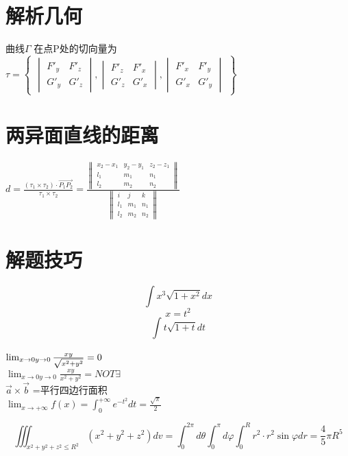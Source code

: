 \documentclass[UTF8]{ctexart}
\begin{document}
\section{解析几何}
曲线$\Gamma $ 在点P处的切向量为
$ \tau =
\begin{Bmatrix}

\begin{vmatrix}
F'_y & F'_z \\
G'_y & G'_z
\end{vmatrix}
,
\begin{vmatrix}
F'_z & F'_x \\
G'_z & G'_x
\end{vmatrix}
,
\begin{vmatrix}
F'_x & F'_y \\
G'_x & G'_y 
\end{vmatrix}
\end{Bmatrix}
$

\section{两异面直线的距离}
$ d= \frac{ (\tau_1 \times \tau_2)\cdot \overrightarrow{P_1 P_2}}{\tau_1 \times \tau_2} = \frac{\begin{Vmatrix}
x_2-x_1 & y_2-y_1 & z_2-z_1 \\
l_1 & m_1 & n_1 \\
l_2 & m_2 & n_2 
\end{Vmatrix}}{\begin{Vmatrix}
  i & j & k \\
  l_1 & m_1 & n_1 \\
  l_2 & m_2 & n_2 
\end{Vmatrix}}
$

\section{解题技巧}
$$ \int x^3 \sqrt{1+x^2} dx$$
$$ x= t^2 $$
$$ \int t \sqrt{1+t} dt $$
\\
$\lim_{x\rightarrow 0 \\ y \rightarrow 0} \frac{xy}{\sqrt{x^2+y^2}}=0$ \\
$\lim_{x\rightarrow 0 y \rightarrow 0} \frac{xy}{x^2+y^2} = NOT \exists$
\\
$\overrightarrow{a}\times \overrightarrow{b}$ =平行四边行面积
\\
$ \lim_{x \rightarrow + \infty } f(x) = \int_0^{+ \infty } e^{-t^2} dt = \frac{\sqrt{\pi}}{2}$

$$\iiint_{x^2+y^2+z^2  \leq R^2} (x^2+y^2+z^2)dv=\int_0^{2\pi} d \theta \int_0^\pi d \varphi \int_0^R r^2 \cdot r^2 \sin \varphi dr = \frac{4}{5}\pi R^5 $$
\end{document}
